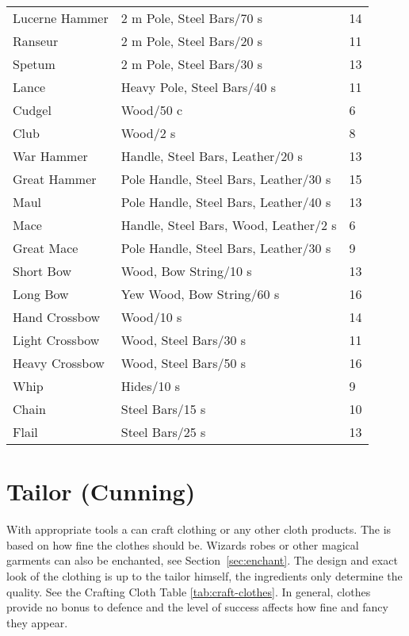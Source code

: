 \documentclass[a4paper,11pt,oneside]{book}
\newcommand{\textlf}[1]{\textbf{\titlecap{#1}}}
\begin{document}
\begin{table}[!ht]
\begin{tabular}{|l|l|l|}
    Lucerne Hammer & 2 m Pole, Steel Bars/70 s & 14\\
    Ranseur & 2 m Pole, Steel Bars/20 s & 11\\
    Spetum & 2 m Pole, Steel Bars/30 s & 13\\
    Lance & Heavy Pole, Steel Bars/40 s & 11\\
    \hline
    Cudgel & Wood/50 c & 6\\
    Club & Wood/2 s & 8\\
    War Hammer & Handle, Steel Bars, Leather/20 s & 13 \\
    Great Hammer & Pole Handle, Steel Bars, Leather/30 s & 15 \\
    Maul & Pole Handle, Steel Bars, Leather/40 s & 13 \\
    Mace & Handle, Steel Bars, Wood, Leather/2 s & 6 \\
    Great Mace & Pole Handle, Steel Bars, Leather/30 s & 9 \\
    \hline
    Short Bow & Wood, Bow String/10 s & 13\\
    Long Bow & Yew Wood, Bow String/60 s & 16\\
    \hline
    Hand Crossbow & Wood/10 s & 14 \\ 
    Light Crossbow & Wood, Steel Bars/30 s & 11\\
    Heavy Crossbow & Wood, Steel Bars/50 s & 16\\
    \hline
    Whip & Hides/10 s & 9\\
    Chain & Steel Bars/15 s & 10\\
    Flail & Steel Bars/25 s & 13\\    
    \hline
    \end{tabular}
\end{table}



\section{Tailor (Cunning)}
With appropriate tools a \textlf{Tailor} can craft clothing or any other cloth products. The \textlf{difficulty} is based on how fine the clothes should be. Wizards robes or other magical garments can also be enchanted, see Section~\ref{sec:enchant}. The design and exact look of the clothing is up to the tailor himself, the ingredients only determine the quality. See the Crafting Cloth Table \ref{tab:craft-clothes}. In general, clothes provide no bonus to defence and the level of success affects how fine and fancy they appear.
\end{document}
